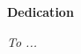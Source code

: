 \vspace*{4\baselineskip}
\begin{center}
    {\large \textbf{Dedication}\\}
    
    \vspace{2\baselineskip}
    
    \textit{To ...}
\end{center}